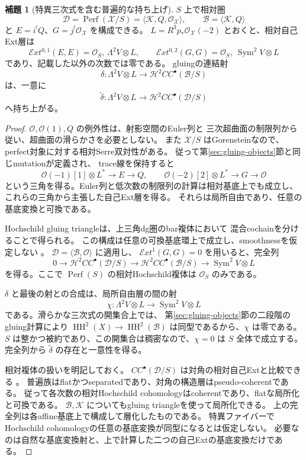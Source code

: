 \documentclass[a4paper,11pt]{ltjsarticle}
\theoremstyle{definition}
\newtheorem{lemma}[theorem]{補題}
\newcommand{\OO}{\mathcal O}
\newcommand{\HH}{\operatorname{HH}}
\newcommand{\Sym}{\operatorname{Sym}}
\newcommand{\Perf}{\operatorname{Perf}}
\begin{document}
\begin{lemma}[特異三次式を含む普遍的な持ち上げ]
\label{lem:universal-tangent-lift}
$S$ 上で相対圏
\[
 \mathcal D=\Perf(\mathcal X/S)
       =\langle\mathcal K,Q,\OO_{\mathcal X}\rangle,
 \qquad\mathcal B=\langle\mathcal K,Q\rangle
\]
と $E=i^!Q$、$G=j^!\OO_{\mathcal X}$ を構成できる。
$L=R^3p_*\OO_{\mathcal X}(-2)$ とおくと、相対自己Ext層は
\[
 \mathcal E xt^{0,1}(E,E)=\OO_S,\ \Lambda^2V\otimes L,
 \qquad
 \mathcal E xt^{0,2}(G,G)=\OO_S,\ \Sym^2V\otimes L
\]
であり、記載した以外の次数では零である。
gluingの連結射
\[
 \delta:\Lambda^2V\otimes L
      \longrightarrow\mathcal H^2CC^\bullet(\mathcal B/S)
\]
は、一意に
\[
 \widetilde\delta:\Lambda^2V\otimes L
      \longrightarrow\mathcal H^2CC^\bullet(\mathcal D/S)
\]
へ持ち上がる。
\end{lemma}

\begin{proof}
$\OO,\OO(1),Q$ の例外性は、射影空間のEuler列と
三次超曲面の制限列から従い、超曲面の滑らかさを必要としない。
また $\mathcal X/S$ はGorensteinなので、perfect対象に対する相対Serre双対性がある。
従って第\ref{sec:gluing-objects}節と同じmutationが定義され、
trace線を保持すると
\[
 \OO(-1)[1]\otimes L^*\longrightarrow E\longrightarrow Q,
 \qquad
 \OO(-2)[2]\otimes L^*\longrightarrow G\longrightarrow\OO
\]
という三角を得る。Euler列と低次数の制限列の計算は相対基底上でも成立し、
これらの三角から主張した自己Ext層を得る。
それらは局所自由であり、任意の基底変換と可換である。

Hochschild gluing triangleは、上三角dg圏のbar複体において
混合cochainを分けることで得られる。
この構成は任意の可換基底環上で成立し、smoothnessを仮定しない
\cite[Section 4.5, (4.5.1)--(4.5.2)]{KellerHoch}。
$\mathcal D=\langle\mathcal B,\OO\rangle$ に適用し、
$\mathcal E xt^1(G,G)=0$ を用いると、完全列
\[
 0\longrightarrow\mathcal H^2CC^\bullet(\mathcal D/S)
 \longrightarrow\mathcal H^2CC^\bullet(\mathcal B/S)
 \longrightarrow\Sym^2V\otimes L
\]
を得る。ここで $\Perf(S)$ の相対Hochschild複体は $\OO_S$ のみである。

$\delta$ と最後の射との合成は、局所自由層の間の射
\[
 \chi:\Lambda^2V\otimes L\longrightarrow\Sym^2V\otimes L
\]
である。滑らかな三次式の開集合上では、
第\ref{sec:gluing-objects}節の二段階のgluing計算により
$\HH^2(X)\to\HH^2(\mathcal B)$ は同型であるから、$\chi$ は零である。
$S$ は整かつ被約であり、この開集合は稠密なので、$\chi=0$ は $S$ 全体で成立する。
完全列から $\widetilde\delta$ の存在と一意性を得る。

相対複体の扱いを明記しておく。
$CC^\bullet(\mathcal D/S)$ は対角の相対自己Extと比較できる
\cite[Section 8.1, Theorem 8.9]{ToenMorita}。
普遍族はflatかつseparatedであり、対角の構造層はpseudo-coherentである。
従って各次数の相対Hochschild cohomologyはcoherentであり、flatな局所化と可換である。
$\mathcal B,\mathcal K$ についてもgluing triangleを使って局所化できる。
上の完全列は各affine基底上で構成して層化したものである。
特異ファイバーでHochschild cohomologyの任意の基底変換が同型になるとは仮定しない。
必要なのは自然な基底変換射と、上で計算した二つの自己Extの基底変換だけである。
\end{proof}
\end{document}
